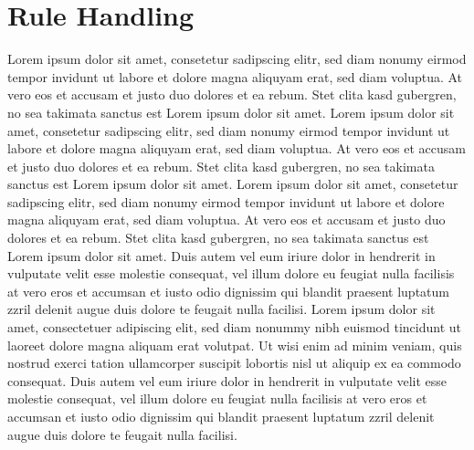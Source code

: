 \chapter{Rule Handling} 

Lorem ipsum dolor sit amet, consetetur sadipscing elitr, sed diam nonumy eirmod tempor invidunt ut
labore et dolore magna aliquyam erat, sed diam voluptua. At vero eos et accusam et justo duo dolores
et ea rebum. Stet clita kasd gubergren, no sea takimata sanctus est Lorem ipsum dolor sit amet. Lorem
ipsum dolor sit amet, consetetur sadipscing elitr, sed diam nonumy eirmod tempor invidunt ut labore
et dolore magna aliquyam erat, sed diam voluptua. At vero eos et accusam et justo duo dolores et ea
rebum. Stet clita kasd gubergren, no sea takimata sanctus est Lorem ipsum dolor sit amet. Lorem ipsum
dolor sit amet, consetetur sadipscing elitr, sed diam nonumy eirmod tempor invidunt ut labore et dolore
magna aliquyam erat, sed diam voluptua. At vero eos et accusam et justo duo dolores et ea rebum. Stet
clita kasd gubergren, no sea takimata sanctus est Lorem ipsum dolor sit amet.
Duis autem vel eum iriure dolor in hendrerit in vulputate velit esse molestie consequat, vel illum dolore
eu feugiat nulla facilisis at vero eros et accumsan et iusto odio dignissim qui blandit praesent luptatum
zzril delenit augue duis dolore te feugait nulla facilisi. Lorem ipsum dolor sit amet, consectetuer adipiscing
elit, sed diam nonummy nibh euismod tincidunt ut laoreet dolore magna aliquam erat volutpat.
Ut wisi enim ad minim veniam, quis nostrud exerci tation ullamcorper suscipit lobortis nisl ut aliquip
ex ea commodo consequat. Duis autem vel eum iriure dolor in hendrerit in vulputate velit esse molestie
consequat, vel illum dolore eu feugiat nulla facilisis at vero eros et accumsan et iusto odio dignissim qui
blandit praesent luptatum zzril delenit augue duis dolore te feugait nulla facilisi.









